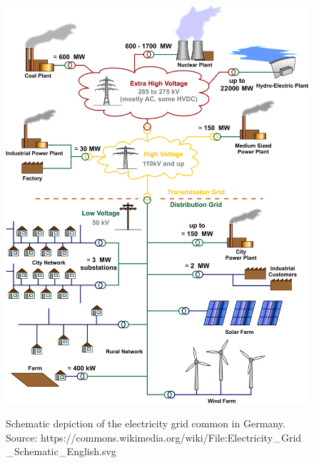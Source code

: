 \begin{figure}[h]
	\begin{centering}
		{\includegraphics[scale=0.27]{figures/background/grid_schematicc.pdf}}
		\caption{Schematic depiction of the electricity grid common in Germany. Source: https://commons.wikimedia.org/wiki/File:Electricity$\protect\_$Grid$\protect\_$Schematic$\protect\_$English.svg}
		\label{fig:schematic_grid}
	\end{centering}
\end{figure}

